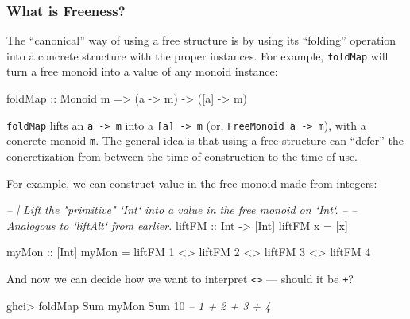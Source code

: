 \documentclass[]{article}
\newenvironment{Shaded}{}{}
\newcommand{\CommentTok}[1]{\textcolor[rgb]{0.38,0.63,0.69}{\textit{#1}}}
\newcommand{\DataTypeTok}[1]{\textcolor[rgb]{0.56,0.13,0.00}{#1}}
\newcommand{\DecValTok}[1]{\textcolor[rgb]{0.25,0.63,0.44}{#1}}
\newcommand{\FunctionTok}[1]{\textcolor[rgb]{0.02,0.16,0.49}{#1}}
\newcommand{\NormalTok}[1]{#1}
\newcommand{\OtherTok}[1]{\textcolor[rgb]{0.00,0.44,0.13}{#1}}
\begin{document}
\hypertarget{what-is-freeness}{%
\subsubsection{What is Freeness?}\label{what-is-freeness}}

The ``canonical'' way of using a free structure is by using its ``folding''
operation into a concrete structure with the proper instances. For example,
\texttt{foldMap} will turn a free monoid into a value of any monoid instance:

\begin{Shaded}
\begin{Highlighting}[]
\FunctionTok{foldMap}\OtherTok{ ::} \DataTypeTok{Monoid}\NormalTok{ m }\OtherTok{=>}\NormalTok{ (a }\OtherTok{->}\NormalTok{ m) }\OtherTok{->}\NormalTok{ ([a] }\OtherTok{->}\NormalTok{ m)}
\end{Highlighting}
\end{Shaded}

\texttt{foldMap} lifts an \texttt{a\ -\textgreater{}\ m} into a
\texttt{{[}a{]}\ -\textgreater{}\ m} (or,
\texttt{FreeMonoid\ a\ -\textgreater{}\ m}), with a concrete monoid \texttt{m}.
The general idea is that using a free structure can ``defer'' the concretization
from between the time of construction to the time of use.

For example, we can construct value in the free monoid made from integers:

\begin{Shaded}
\begin{Highlighting}[]
\CommentTok{-- | Lift the "primitive" `Int` into a value in the free monoid on `Int`.}
\CommentTok{--}
\CommentTok{-- Analogous to `liftAlt` from earlier.}
\OtherTok{liftFM ::} \DataTypeTok{Int} \OtherTok{->}\NormalTok{ [}\DataTypeTok{Int}\NormalTok{]}
\NormalTok{liftFM x }\FunctionTok{=}\NormalTok{ [x]}

\OtherTok{myMon ::}\NormalTok{ [}\DataTypeTok{Int}\NormalTok{]}
\NormalTok{myMon }\FunctionTok{=}\NormalTok{ liftFM }\DecValTok{1} \FunctionTok{<>}\NormalTok{ liftFM }\DecValTok{2} \FunctionTok{<>}\NormalTok{ liftFM }\DecValTok{3} \FunctionTok{<>}\NormalTok{ liftFM }\DecValTok{4}
\end{Highlighting}
\end{Shaded}

And now we can decide how we want to interpret
\texttt{\textless{}\textgreater{}} --- should it be \texttt{+}?

\begin{Shaded}
\begin{Highlighting}[]
\NormalTok{ghci}\FunctionTok{>} \FunctionTok{foldMap} \DataTypeTok{Sum}\NormalTok{ myMon}
\DataTypeTok{Sum} \DecValTok{10}              \CommentTok{-- 1 + 2 + 3 + 4}
\end{Highlighting}
\end{Shaded}
\end{document}
